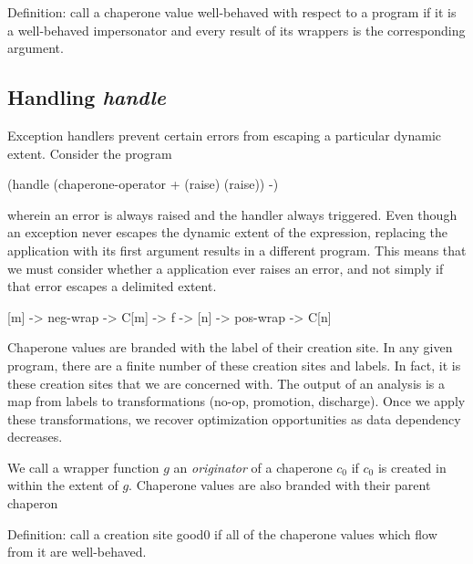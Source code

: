 \documentclass{sigplanconf}
\begin{document}
Definition: call a chaperone value well-behaved with respect to a program if it is a well-behaved impersonator and every result of its wrappers is  the corresponding argument.

\subsection{Handling \emph{handle}}

Exception handlers prevent certain errors from escaping a particular dynamic extent.
Consider the program
\begin{schemedisplay}
(handle
  (chaperone-operator + (raise) (raise))
  -)
\end{schemedisplay}
wherein an error is always raised and the handler always triggered.
Even though an exception never escapes the dynamic extent of the  expression, replacing the  application with its first argument results in a different program. 
This means that we must consider whether a  application ever raises an error, and not simply if that error escapes a delimited extent.

[m] -> neg-wrap -> C[m] -> f -> [n] -> pos-wrap -> C[n]

Chaperone values are branded with the label of their creation site. In any given program, there are a finite number of these creation sites and labels. In fact, it is these creation sites that we are concerned with. The output of an analysis is a map from labels to transformations (no-op, promotion, discharge). Once we apply these transformations, we recover optimization opportunities as data dependency decreases.

We call a wrapper function $g$ an \emph{originator} of a chaperone $c_0$ if $c_0$ is created in within the extent of $g$. Chaperone values are also branded with their parent chaperon

Definition: call a creation site good0 if all of the chaperone values which flow from it are well-behaved.
\end{document}
